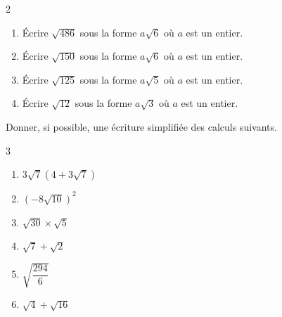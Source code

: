 {%
\begin{Exercice}
\leavevmode\vspace{-\baselineskip}
\vspace{-0.5cm}
\begin{multicols}{2}
\begin{enumerate}[itemsep=1em]
	\item \begin{minipage}[t]{\linewidth} Écrire $\sqrt{486}$ sous la forme $a\sqrt{6}$ où $a$ est un entier. \end{minipage}
	\item \begin{minipage}[t]{\linewidth} Écrire $\sqrt{150}$ sous la forme $a\sqrt{6}$ où $a$ est un entier. \end{minipage}
	\item \begin{minipage}[t]{\linewidth} Écrire $\sqrt{125}$ sous la forme $a\sqrt{5}$ où $a$ est un entier. \end{minipage}
	\item \begin{minipage}[t]{\linewidth} Écrire $\sqrt{12}$ sous la forme $a\sqrt{3}$ où $a$ est un entier. \end{minipage}
\end{enumerate}
\end{multicols}
\end{Exercice}

\begin{Exercice}
Donner, si possible, une écriture simplifiée des calculs suivants.
\begin{multicols}{3}
\begin{enumerate}[itemsep=1em]
	\item \begin{minipage}[t]{\linewidth} $ 3 \sqrt{7}\left( 4  +3\sqrt{7}\right)$ \end{minipage}
	\item \begin{minipage}[t]{\linewidth} $\left(-8 \sqrt{10}\right)^{2}$ \end{minipage}
	\item \begin{minipage}[t]{\linewidth} $ \sqrt{30}\times \sqrt{5}$ \end{minipage}
	\item \begin{minipage}[t]{\linewidth} $\sqrt{7}+\sqrt{2}$ \end{minipage}
	\item \begin{minipage}[t]{\linewidth} $ \sqrt{\dfrac{294}{6}}$ \end{minipage}
	\item \begin{minipage}[t]{\linewidth} $  \sqrt{4}+\sqrt{16}$ \end{minipage}
\end{enumerate}
\end{multicols}
\end{Exercice}

}
